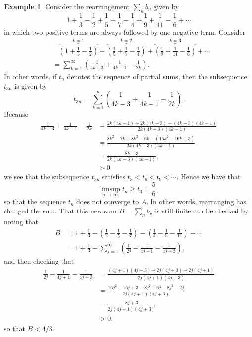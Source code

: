 \documentclass[12pt]{article}
\theoremstyle{definition}
\newtheorem{example}[definition]{Example}
\theoremstyle{theorem}
\begin{document}
\begin{example}
Consider the rearrangement $\sum_n b_n$ given by 
\[
1 + \frac{1}{3} - \frac{1}{2} + \frac{1}{5} + \frac{1}{7} - \frac{1}{4} + \frac{1}{9} + \frac{1}{11} - \frac{1}{6} + \cdots
\]
in which two positive terms are always followed by one negative term. Consider 
\begin{align*}
&\;\;\; \overbrace{\left(1 + \frac{1}{3} - \frac{1}{2}\right)}^{k=1} + \overbrace{\left(\frac{1}{5} + \frac{1}{7} - \frac{1}{4}\right)}^{k=2} + \overbrace{\left(\frac{1}{9} + \frac{1}{11} - \frac{1}{6}\right)}^{k=3} + \cdots \\
&= \sum_{k=1}^\infty \left(\frac{1}{4k-3} + \frac{1}{4k - 1} - \frac{1}{2k}\right).
\end{align*}
In other words, if $t_n$ denotes the sequence of partial sums, then the subsequence $t_{3n}$ is given by
\[
t_{3n} = \sum_{k=1}^n \left(\frac{1}{4k-3} + \frac{1}{4k - 1} - \frac{1}{2k}\right).
\]
Because 
\begin{align*}
\frac{1}{4k-3} + \frac{1}{4k - 1} - \frac{1}{2k} &= \frac{2k(4k-1) + 2k(4k-3) - (4k-3)(4k-1)}{2k(4k-3)(4k-1)} \\
&= \frac{8k^2 - 2k + 8k^2 - 6k - (16k^2 -16k +3)}{2k(4k-3)(4k-1)} \\
&= \frac{8k - 3}{2k(4k-3)(4k-1)},  \\
&> 0 
\end{align*}
we see that the subsequence $t_{3n}$ satisfies $t_3 < t_6 < t_9 < \cdots$. Hence we have that 
\[
\limsup_{n \to \infty}t_n \geqslant t_3 = \frac{5}{6},
\]
so that the sequence $t_n$ does not converge to $A$. In other words, rearranging has changed the sum. That this new sum $B = \sum_n b_n$ is still finite can be checked by noting that 
\begin{align*}
B &= 1 + \frac{1}{3} - \left(\frac{1}{2} - \frac{1}{5} - \frac{1}{7}\right) - \left(\frac{1}{4} - \frac{1}{9} - \frac{1}{11}\right) -  \cdots \\
&= 1 + \frac{1}{3} - \sum_{j=1}^\infty\left(\frac{1}{2j} - \frac{1}{4j + 1} - \frac{1}{4j+3}\right),
\end{align*}
and then checking that 
\begin{align*}
\frac{1}{2j} - \frac{1}{4j + 1} - \frac{1}{4j+3} &= \frac{(4j+1)(4j+3) - 2j(4j+3) - 2j(4j+1)}{2j(4j+1)(4j+3)} \\
&= \frac{16j^2 + 16j + 3 - 8j^2 - 6j - 8j^2 - 2j}{2j(4j+1)(4j+3)} \\
&= \frac{8j+3}{2j(4j+1)(4j+3)} \\
&> 0,
\end{align*}
so that $B < 4/3$. 
\end{example}
\end{document}
